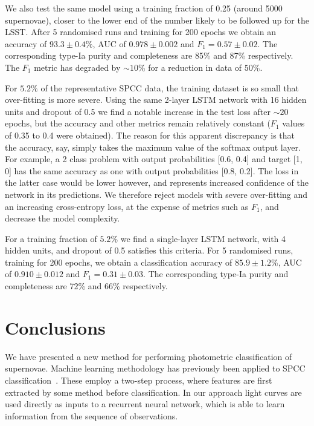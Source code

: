 \documentclass[twocolumn]{aastex61}
\begin{document}
We also test the same model using a training fraction of 0.25 (around 5000 supernovae), closer to the lower end of the number likely to be followed up for the LSST. After 5 randomised runs and training for 200 epochs we obtain an accuracy of $93.3 \pm 0.4\%$, AUC of $0.978 \pm 0.002$ and $F_1 = 0.57 \pm 0.02$. The corresponding type-Ia purity and completeness are 85\% and 87\% respectively. The $F_1$ metric has degraded by $\sim10\%$ for a reduction in data of $50\%$.

For $5.2\%$ of the representative SPCC data, the training dataset is so small that over-fitting is more severe. Using the same 2-layer LSTM network with 16 hidden units and dropout of 0.5 we find a notable increase in the test loss after $\sim 20$ epochs, but the accuracy and other metrics remain relatively constant ($F_1$ values of 0.35 to 0.4 were obtained). The reason for this apparent discrepancy is that the accuracy, say, simply takes the maximum value of the softmax output layer. For example, a 2 class problem with output probabilities [0.6, 0.4] and target [1, 0] has the same accuracy as one with output probabilities [0.8, 0.2]. The loss in the latter case would be lower however, and represents increased confidence of the network in its predictions. We therefore reject models with severe over-fitting and an increasing cross-entropy loss, at the expense of metrics such as $F_1$, and decrease the model complexity. 

For a training fraction of  $5.2\%$ we find a single-layer LSTM network, with 4 hidden units, and dropout of 0.5 satisfies this criteria. For 5 randomised runs, training for 200 epochs, we obtain a classification accuracy of $85.9 \pm 1.2$\%, AUC of $0.910 \pm 0.012$ and $F_1 = 0.31 \pm 0.03$. The corresponding type-Ia purity and completeness are 72\% and 66\% respectively.

\section{Conclusions}

We have presented a new method for performing photometric classification of supernovae. Machine learning methodology has previously been applied to SPCC classification~\cite{Newling:2010bp, Karpenka:2012pm, Lochner:2016hbn}. These employ a two-step process, where features are first extracted by some method before classification. In our approach light curves are used directly as inputs to a recurrent neural network, which is able to learn information from the sequence of observations.
\end{document}
